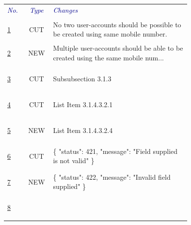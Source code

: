 \documentclass{article}%
\makeatletter
\newcommand{\tinytosmall}{%
  \fontsize
    {\fpeval{(\f@size@tiny+\f@size@small)/2}}
    {\fpeval{(\f@baselineskip@tiny+\f@baselineskip@small)/2}}%
  \selectfont
}
\makeatother
\begin{document}
%
\begin{longtable}{l c p{0.75\linewidth}}%
\arrayrulecolor{fpcblue2}%
\hline%
\rowcolor{fpcblue1}%
\textcolor{darkblue}%
                {\tinytosmall{\textit{No.}}}&\textcolor{darkblue}%
                {\tinytosmall{\textit{Type}}}&\textcolor{darkblue}%
                {\tinytosmall{\textit{Changes}}}\\%
\arrayrulecolor{fpcblue2}%
\hline%
\endhead%
\arrayrulecolor{fpcblue2}%
\hline%
\multicolumn{3}{r}{\faEllipsisH \xspace \faArrowRight}\\%
\arrayrulecolor{fpcblue2}%
\hline%
\endfoot%
\arrayrulecolor{fpcblue2}%
\hline%
\endlastfoot%
\hypertarget{CSREF:0}{}%
\tinytosmall{\hyperlink{ID:647373762}{1}}&\textcolor{red!80!gray}%
{\tiny{\faCut\xspace CUT}}&\tinytosmall{No two user{-}accounts should be possible to be created using same mobile number.}\\%
\hypertarget{CSREF:1}{}%
\tinytosmall{\hyperlink{ID:1142536003}{2}}&\textcolor{cobalt}%
{\tiny{\faPlus\xspace NEW}}&\tinytosmall{Multiple user{-}accounts should be able to be created using the same mobile num...}\\%
\hypertarget{CSREF:2}{}%
\tinytosmall{\hyperlink{ID:1334495193}{3}}&\textcolor{red!80!gray}%
{\tiny{\faCut\xspace CUT}}&\tinytosmall{Subsubsection 3.1.3}\\%
\hypertarget{CSREF:3}{}%
\tinytosmall{\hyperlink{ID:1569258615}{4}}&\textcolor{red!80!gray}%
{\tiny{\faCut\xspace CUT}}&\tinytosmall{List Item 3.1.4.3.2.1}\\%
\hypertarget{CSREF:4}{}%
\tinytosmall{\hyperlink{ID:476207585}{5}}&\textcolor{cobalt}%
{\tiny{\faPlus\xspace NEW}}&\tinytosmall{List Item 3.1.4.3.2.4}\\%
\hypertarget{CSREF:5}{}%
\tinytosmall{\hyperlink{ID:641988819}{6}}&\textcolor{red!80!gray}%
{\tiny{\faCut\xspace CUT}}&\tinytosmall{\{\newline%
  "status": 421,\newline%
  "message": "Field supplied is not valid"\newline%
\}}\\%
\hypertarget{CSREF:6}{}%
\tinytosmall{\hyperlink{ID:556812726}{7}}&\textcolor{cobalt}%
{\tiny{\faPlus\xspace NEW}}&\tinytosmall{\{\newline%
  "status": 422,\newline%
  "message": "Invalid field supplied"\newline%
\}}\\%
\hypertarget{CSREF:7}{}%
\tinytosmall{\hyperlink{ID:1640027012}{8}}&\textcolor{red!80!gray}%

\end{longtable}
\end{document}
